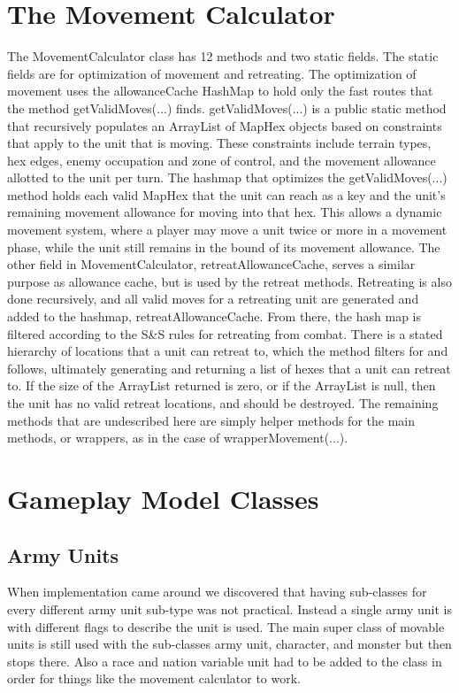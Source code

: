 \documentclass[12pt,a4paper]{article}
\begin{document}
\section{The Movement Calculator}
The MovementCalculator class has 12 methods and two static fields. The static 
fields are for optimization of movement and retreating. The optimization of 
movement uses the allowanceCache HashMap to hold only the fast routes that the 
method getValidMoves(...) finds. getValidMoves(...) is a public static method 
that recursively populates an ArrayList of MapHex objects based on constraints
that apply to the unit that is moving. These constraints include terrain types, 
hex edges, enemy occupation and zone of control, and the movement allowance 
allotted to the unit per turn. The hashmap that optimizes the getValidMoves(...)
method holds each valid MapHex that the unit can reach as a key and the unit's 
remaining movement allowance for moving into that hex. This allows a dynamic
movement system, where a player may move a unit twice or more in a movement 
phase, while the unit still remains in the bound of its movement allowance.
The other field in MovementCalculator, retreatAllowanceCache, serves a similar
purpose as allowance cache, but is used by the retreat methods. Retreating is
also done recursively, and all valid moves for a retreating unit are generated
and added to the hashmap, retreatAllowanceCache. From there, the hash map is 
filtered according to the S\&S rules for retreating from combat. There is a 
stated hierarchy of locations that a unit can retreat to, which the method 
filters for and follows, ultimately generating and returning a list of 
hexes that a unit can retreat to. If the size of the ArrayList returned is 
zero, or if the ArrayList is null, then the unit has no valid retreat 
locations, and should be destroyed. The remaining methods that are undescribed
here are simply helper methods for the main methods, or wrappers, as in the 
case of wrapperMovement(...). 

\section{Gameplay Model Classes}
\subsection{Army Units}
When implementation came around we discovered that having sub-classes for every 
different army unit sub-type was not practical. Instead a single army unit is 
with different flags to describe the unit is used. The main super class of 
movable units is still used with the sub-classes army unit, character, and 
monster but then stops there. Also a race and nation variable unit had to be 
added to the class in order for things like the movement calculator to work. 
\end{document}
